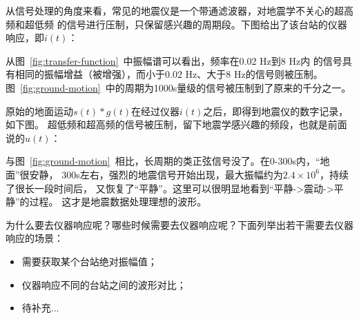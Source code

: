 从信号处理的角度来看，常见的地震仪是一个带通滤波器，对地震学不关心的超高频和超低频
的信号进行压制，只保留感兴趣的周期段。下图给出了该台站的仪器响应，即$i(t)$：

从图~\ref{fig:transfer-function}~中振幅谱可以看出，频率在0.02 Hz到8 Hz内
的信号具有相同的振幅增益（被增强），而小于0.02 Hz、大于8 Hz的信号则被压制。
图~\ref{fig:ground-motion}~中的周期为1000s量级的信号被压制到了原来的千分之一。

原始的地面运动$s(t)*g(t)$在经过仪器$i(t)$之后，即得到地震仪的数字记录，如下图。
超低频和超高频的信号被压制，留下地震学感兴趣的频段，也就是前面说的$u(t)$：

与图~\ref{fig:ground-motion}~相比，长周期的类正弦信号没了。在0-300s内，“地面”很安静，
300s左右，强烈的地震信号开始出现，最大振幅约为$2.4\times10^6$，持续了很长一段时间后，
又恢复了“平静”。这里可以很明显地看到“平静->震动->平静”的过程。
这才是地震数据处理理想的波形。

为什么要去仪器响应呢？哪些时候需要去仪器响应呢？下面列举出若干需要去仪器响应的场景：

\begin{itemize}
\item 需要获取某个台站绝对振幅值；
\item 仪器响应不同的台站之间的波形对比；
\item 待补充...
\end{itemize}
